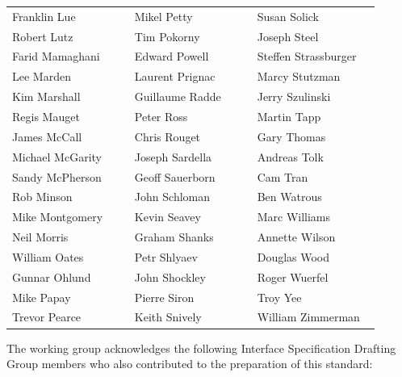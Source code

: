 \thispagestyle{front}
\begingroup
\fontsize{8.55}{10.05}\selectfont
\setlength{\parskip}{6.0pt plus .4pt minus .4pt}
\vspace*{-2pt}
{\fontsize{8.15}{9.15}\selectfont
\renewcommand{\arraystretch}{0.98}
    \begin{tabular}{@{}Y{0.31\linewidth}Y{0.31\linewidth}Y{0.31\linewidth}@{}}
        Franklin Lue     & Mikel Petty     & Susan Solick         \\
        Robert Lutz      & Tim Pokorny     & Joseph Steel         \\
        Farid Mamaghani  & Edward Powell   & Steffen Strassburger \\
        Lee Marden       & Laurent Prignac & Marcy Stutzman       \\
        Kim Marshall     & Guillaume Radde & Jerry Szulinski      \\
        Regis Mauget     & Peter Ross      & Martin Tapp          \\
        James McCall     & Chris Rouget    & Gary Thomas          \\
        Michael McGarity & Joseph Sardella & Andreas Tolk         \\
        Sandy McPherson  & Geoff Sauerborn & Cam Tran             \\
        Rob Minson       & John Schloman   & Ben Watrous          \\
        Mike Montgomery  & Kevin Seavey    & Marc Williams        \\
        Neil Morris      & Graham Shanks   & Annette Wilson       \\
        William Oates    & Petr Shlyaev    & Douglas Wood         \\
        Gunnar Ohlund    & John Shockley   & Roger Wuerfel        \\
        Mike Papay       & Pierre Siron    & Troy Yee             \\
        Trevor Pearce    & Keith Snively   & William Zimmerman    \\
    \end{tabular}}

\vspace{10pt}
The working group acknowledges the following Interface Specification Drafting Group members who also contributed to the preparation of this standard:

